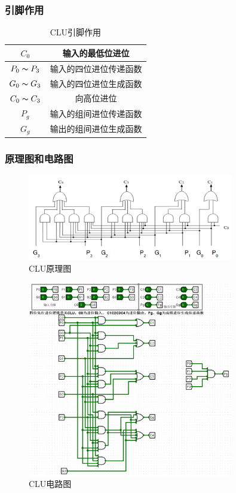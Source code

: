 \documentclass{article}
\begin{document}
    \subsubsection{引脚作用}
    \begin{table}[H]
    \centering
    \begin{tabular}{|c|c|}
        \hline
        $C_{0}$  & 输入的最低位进位 \\ \hline
        $P_{0}\thicksim P_{3}$ & 输入的四位进位传递函数 \\ \hline
        $G_{0}\thicksim G_{3}$   & 输入的四位进位生成函数 \\ \hline
        $C_{0}\thicksim C_{3}$   & 向高位进位 \\ \hline
        $P_{g}$   & 输入的组间进位传递函数 \\ \hline
        $G_{g}$   & 输出的组间进位生成函数 \\ \hline
    \end{tabular}
    \caption{CLU引脚作用}
    \end{table}

    \subsubsection{原理图和电路图}
    \begin{figure}[H]
    \centering
    \includegraphics[width=0.8\textwidth]{1.4.1.png}
    \caption{CLU原理图}
    \end{figure}

    \begin{figure}[H]
    \centering
    \includegraphics[width=0.8\textwidth]{1.4.2.png}
    \caption{CLU电路图}
    \end{figure}
\end{document}

